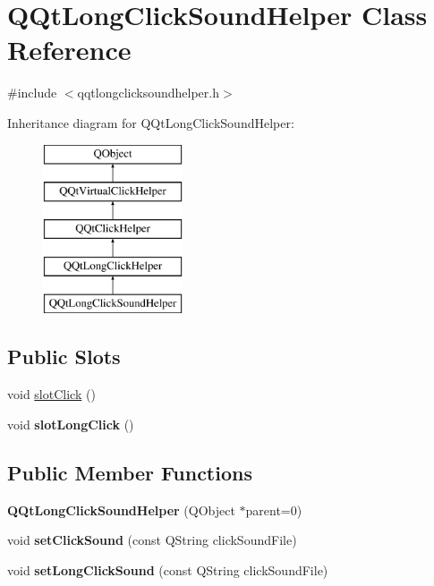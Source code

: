 \hypertarget{class_q_qt_long_click_sound_helper}{}\section{Q\+Qt\+Long\+Click\+Sound\+Helper Class Reference}
\label{class_q_qt_long_click_sound_helper}


{\ttfamily \#include $<$qqtlongclicksoundhelper.\+h$>$}

Inheritance diagram for Q\+Qt\+Long\+Click\+Sound\+Helper\+:\begin{figure}[H]
\begin{center}
\leavevmode
\includegraphics[height=5.000000cm]{class_q_qt_long_click_sound_helper}
\end{center}
\end{figure}
\subsection*{Public Slots}
\begin{DoxyCompactItemize}
\item 
void \mbox{\hyperlink{class_q_qt_long_click_sound_helper_a753866cb78009d352b61f4e903d676b6}{slot\+Click}} ()
\item 
\mbox{\label{class_q_qt_long_click_sound_helper_a796227fd3dd4cb04e5f59f7ed26e048e}} 
void {\bfseries slot\+Long\+Click} ()
\end{DoxyCompactItemize}
\subsection*{Public Member Functions}
\begin{DoxyCompactItemize}
\item 
\mbox{\label{class_q_qt_long_click_sound_helper_aacb2b6ddfd086eb7e8ef918660c67668}} 
{\bfseries Q\+Qt\+Long\+Click\+Sound\+Helper} (Q\+Object $\ast$parent=0)
\item 
\mbox{\label{class_q_qt_long_click_sound_helper_aa8987b5a4d0611070a0cc4bcaf3dadca}} 
void {\bfseries set\+Click\+Sound} (const Q\+String click\+Sound\+File)
\item 
\mbox{\label{class_q_qt_long_click_sound_helper_a40700bf44e666050930040c544a7e562}} 
void {\bfseries set\+Long\+Click\+Sound} (const Q\+String click\+Sound\+File)
\end{DoxyCompactItemize}
